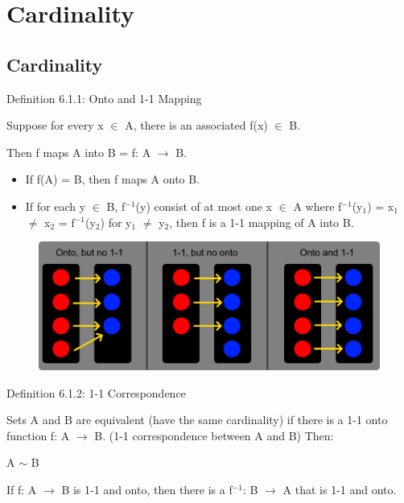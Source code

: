 \newpage
\section[Day 6: Cardinality]{Cardinality}

\subsection{Cardinality}

{ \color{blue} Definition 6.1.1: Onto and 1-1 Mapping } 

	\begin{adjustbox}{minipage=14cm, right, vspace=0.1cm 0cm}
		Suppose for every x $\in$ A, there is an associated f(x) $\in$ B.

		Then f maps A into B = f: A $\rightarrow$ B.

		\begin{itemize}[leftmargin=1cm, itemsep=0.1cm]
			\item If f(A) = B, then f maps A onto B.
			
			\item If for each y $\in$ B, f$^{-1}$(y) consist of at most one x $\in$ A
				where f$^{-1}$(y$_1$) = x$_1$ $\neq$ x$_2$ = f$^{-1}$(y$_2$) for y$_1$ $\neq$ y$_2$,
				then f is a 1-1 mapping of A into B.
		\end{itemize}
	\end{adjustbox}

\begin{figure}[h]
	\centering
	\includegraphics[scale=0.3]{Images/6.1.1.png}
\end{figure}

{ \color{blue} Definition  6.1.2: 1-1 Correspondence} 

	\begin{adjustbox}{minipage=14cm, right, vspace=0.1cm 0cm}
		Sets A and B are equivalent {\color{lblue} (have the same cardinality)} if there is
		a 1-1 onto function f: A $\rightarrow$ B. {\color{lblue} (1-1 correspondence between A and B)}
		Then:

		\qquad A $\sim$ B

		If f: A $\rightarrow$ B is 1-1 and onto, then
		there is a f$^{-1}$: B $\rightarrow$ A that is 1-1 and onto. \\
	\end{adjustbox}

